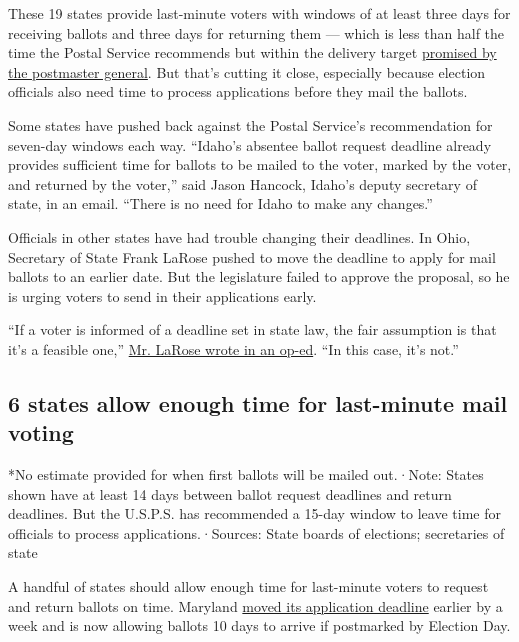 These 19 states provide last-minute voters with windows of at least
three days for receiving ballots and three days for returning them ---
which is less than half the time the Postal Service recommends but
within the delivery target
\href{https://www.nytimes3xbfgragh.onion/reuters/2020/08/21/us/politics/21reuters-usa-election-post-office-senate.html}{promised
by the postmaster general}. But that's cutting it close, especially
because election officials also need time to process applications before
they mail the ballots.

Some states have pushed back against the Postal Service's recommendation
for seven-day windows each way. ``Idaho's absentee ballot request
deadline already provides sufficient time for ballots to be mailed to
the voter, marked by the voter, and returned by the voter,'' said Jason
Hancock, Idaho's deputy secretary of state, in an email. ``There is no
need for Idaho to make any changes.''

Officials in other states have had trouble changing their deadlines. In
Ohio, Secretary of State Frank LaRose pushed to move the deadline to
apply for mail ballots to an earlier date. But the legislature failed to
approve the proposal, so he is urging voters to send in their
applications early.

``If a voter is informed of a deadline set in state law, the fair
assumption is that it's a feasible one,''
\href{https://www.dispatch.com/opinion/20200727/column-time-is-running-out-for-crucial-ohio-election-law-fix}{Mr.
LaRose wrote in an op-ed}. ``In this case, it's not.''

\hypertarget{6-states-allow-enough-time-for-last-minute-mail-voting}{%
\subsection{\texorpdfstring{6 states \textbf{allow enough time} for
last-minute mail
voting}{6 states allow enough time for last-minute mail voting}}\label{6-states-allow-enough-time-for-last-minute-mail-voting}}

*No estimate provided for when first ballots will be mailed out.·Note:
States shown have at least 14 days between ballot request deadlines and
return deadlines. But the U.S.P.S. has recommended a 15-day window to
leave time for officials to process applications.·Sources: State boards
of elections; secretaries of state

A handful of states should allow enough time for last-minute voters to
request and return ballots on time. Maryland
\href{https://www.elections.maryland.gov/press_room/documents/USPS\%20Statement.pdf}{moved
its application deadline} earlier by a week and is now allowing ballots
10 days to arrive if postmarked by Election Day.

